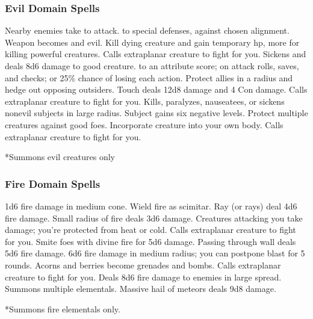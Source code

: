 \subsubsection{Evil Domain Spells}

\begin{spelllist}
   Nearby enemies take  to attack.
    to special defenses,  against chosen alignment.
   Weapon becomes  and evil.
   Kill dying creature and gain temporary hp, more for killing powerful creatures.
  \spellhead[3]{}
  \spellhead[3]{}
   Calls extraplanar creature to fight for you.
   Sickens and deals 8d6 damage to good creature.
    to an attribute score;  on attack rolls, saves, and checks; or 25\% chance of losing each action.
   Protect allies in a \areamed radius and hedge out opposing outsiders.
   Touch deals 12d8 damage and 4 Con damage.
   Calls extraplanar creature to fight for you.
   Kills, paralyzes, nauseatees, or sickens nonevil subjects in large radius.
  \spellhead[7]{}
   Subject gains six negative levels.
  \F Protect multiple creatures against good foes. 
   Incorporate creature into your own body.
   Calls extraplanar creature to fight for you.
\end{spelllist}
*Summons evil creatures only

\subsubsection{Fire Domain Spells}

\begin{spelllist}
   1d6 fire damage in medium cone.
  \spellhead[1]{}
   Wield fire as scimitar.
   Ray (or rays) deal 4d6 fire damage.
  \spellhead[3]{}
   Small radius of fire deals 3d6 damage.
   Creatures attacking you take damage; you're protected from heat or cold.
   Calls extraplanar creature to fight for you.
   Smite foes with divine fire for 5d6 damage.
   Passing through wall deals 5d6 fire damage.
   6d6 fire damage in medium radius; you can postpone blast for 5 rounds.
   Acorns and berries become grenades and bombs.
  \spellhead[7]{}
   Calls extraplanar creature to fight for you.
   Deals 8d6 fire damage to enemies in large spread.
   Summons multiple elementals.
   Massive hail of meteors deals 9d8 damage.
\end{spelllist}
*Summons fire elementals only.

